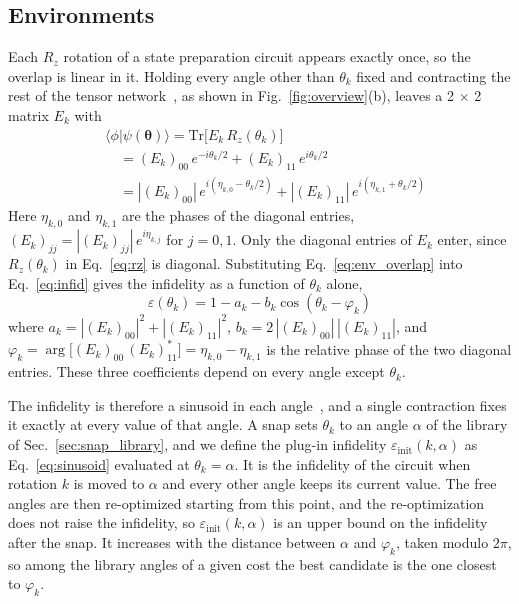 \subsection{Environments}
\label{sec:snap_env}
Each $R_z$ rotation of a state preparation circuit appears exactly once, so the overlap is linear in it. Holding every angle other than $\theta_k$ fixed and contracting the rest of the tensor network~\cite{EvenblyVidal2009}, as shown in Fig.~\ref{fig:overview}(b), leaves a 2 $\times$ 2 matrix $E_k$ with 
\begin{equation}
\begin{split}
&\langle \phi | \psi(\boldsymbol{\theta}) \rangle = \mathrm{Tr}\big[ E_k\, R_z(\theta_k) \big] \\
&\quad = (E_k)_{00}\, e^{-i\theta_k/2} + (E_k)_{11}\, e^{i\theta_k/2} \\
&\quad = |(E_k)_{00}|\, e^{i(\eta_{k,0} - \theta_k/2)} + |(E_k)_{11}|\, e^{i(\eta_{k,1} + \theta_k/2)}
\end{split}
\label{eq:env_overlap}
\end{equation}
Here $\eta_{k,0}$ and $\eta_{k,1}$ are the phases of the diagonal entries, $(E_k)_{jj} = |(E_k)_{jj}|\, e^{i\eta_{k,j}}$ for $j = 0, 1$. Only the diagonal entries of $E_k$ enter, since $R_z(\theta_k)$ in Eq.~\eqref{eq:rz} is diagonal. Substituting Eq.~\eqref{eq:env_overlap} into Eq.~\eqref{eq:infid} gives the infidelity as a function of $\theta_k$ alone,
\begin{equation}
\varepsilon(\theta_k) = 1 - a_k - b_k \cos(\theta_k - \varphi_k)
\label{eq:sinusoid}
\end{equation}
where $a_k = |(E_k)_{00}|^2 + |(E_k)_{11}|^2$, $b_k = 2\,|(E_k)_{00}|\,|(E_k)_{11}|$, and $\varphi_k = \arg\big[(E_k)_{00}\,(E_k)_{11}^{*}\big] = \eta_{k,0} - \eta_{k,1}$ is the relative phase of the two diagonal entries. These three coefficients depend on every angle except $\theta_k$.

The infidelity is therefore a sinusoid in each angle~\cite{Nakanishi2020, Ostaszewski2021}, and a single contraction fixes it exactly at every value of that angle. A snap sets $\theta_k$ to an angle $\alpha$ of the library of Sec.~\ref{sec:snap_library}, and we define the plug-in infidelity $\varepsilon_{\mathrm{init}}(k, \alpha)$ as Eq.~\eqref{eq:sinusoid} evaluated at $\theta_k = \alpha$. It is the infidelity of the circuit when rotation $k$ is moved to $\alpha$ and every other angle keeps its current value. The free angles are then re-optimized starting from this point, and the re-optimization does not raise the infidelity, so $\varepsilon_{\mathrm{init}}(k, \alpha)$ is an upper bound on the infidelity after the snap. It increases with the distance between $\alpha$ and $\varphi_k$, taken modulo $2\pi$, so among the library angles of a given cost the best candidate is the one closest to $\varphi_k$.

